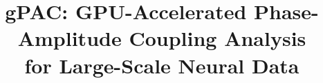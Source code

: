 \title{
    gPAC: GPU-Accelerated Phase-Amplitude Coupling Analysis \\
    for Large-Scale Neural Data
}

\def\shorttitle{gPAC: GPU-Accelerated PAC Analysis}

